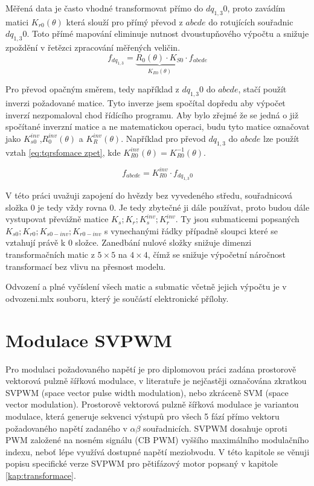     Měřená data je často vhodné transformovat přímo do $dq_{1,3}0$, proto zavádím matici  $K_{r0}(\theta)$ která slouží  pro přímý převod z $abcde$ do rotujících souřadnic $dq_{1,3}0$. Toto přímé mapování eliminuje nutnost dvoustupňového výpočtu a snižuje zpoždění v řetězci zpracování měřených veličin.
\begin{equation}
    f_{dq_{1,3}}= \underbrace{R_0(\theta) \cdot K_{S0}}_{K_{R0}(\theta)} \cdot f_{abcde}
\end{equation}



Pro převod opačným směrem, tedy například z $dq_{1,3}0$ do $abcde$, stačí použít inverzi požadované matice. Tyto inverze jsem spočítal dopředu aby výpočet inverzí nezpomaloval chod řídícího programu. Aby bylo zřejmé že se jedná o již spočítané inverzní matice a ne matematickou operaci, budu tyto matice označovat jako $K_{s0}^{inv}$,$R_{0}^{inv}(\theta)$ a $K_{R}^{inv}(\theta)$. Například pro převod  $dq_{1,3}$ do $abcde$ lze použít vztah \ref{eq:tqrsfomace zpet}, kde  $K_{R0}^{inv}(\theta)=K_{R0}^{-1}(\theta)$.  

\begin{equation}
    \label{eq:tqrsfomace zpet}
    f_{abcde}=K_{R0}^{inv} \cdot f_{dq_{1,3}0}
\end{equation}



V této práci uvažuji zapojení do hvězdy bez vyvedeného středu, souřadnicová složka 0 je tedy  vždy rovna 0. Je tedy zbytečné ji dále používat, proto budou dále vystupovat převážně matice $K_s; K_r;K_{s}^{inv};K_{r}^{inv}$. Ty jsou submaticemi popsaných $K_{s0}; K_{r0};K_{s0-inv};K_{r0-inv}$ s vynechanými řádky případně sloupci které se vztahují právě k 0 složce. Zanedbání nulové složky snižuje dimenzi transformačních matic z $5\times5$ na $4\times4$, čímž se snižuje výpočetní náročnost transformací bez vlivu na přesnost modelu.


Odvození a plné vyčíslení všech matic a submatic včetně jejich výpočtu je v odvozeni.mlx souboru, který je součástí elektronické přílohy.



\section{Modulace SVPWM}
\label{kap:svm}
Pro modulaci požadovaného napětí je pro diplomovou práci zadána prostorově vektorová pulzně šířková modulace, v literatuře je nejčastěji označována zkratkou SVPWM (space vector pulse width modulation), nebo zkráceně SVM (space vector modulation). Prostorově vektorová pulzně šířková modulace je variantou modulace, která generuje sekvenci výstupů pro všech 5 fází přímo vektoru požadovaného napětí zadaného v $\alpha \beta$ souřadnicích. SVPWM dosahuje oproti PWM založené na nosném signálu (CB PWM) vyššího maximálního modulačního indexu, neboť lépe využívá dostupné napětí meziobvodu. V této kapitole se věnuji popisu specifické verze  SVPWM pro pětifázový motor popsaný v kapitole \ref{kap:transformace}.\cite{analyseOfMultiphase}


